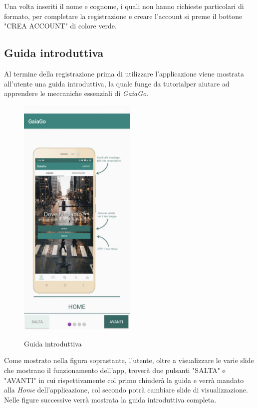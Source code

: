 Una volta inseriti il nome e cognome, i quali non hanno richieste particolari di formato, per completare la registrazione e creare l'account si preme il bottone "CREA ACCOUNT" di colore verde.
\pagebreak
\subsection{Guida introduttiva}
Al termine della registrazione prima di utilizzare l'applicazione viene mostrata all'utente una guida introduttiva, la quale funge da tutorial\glosp per aiutare ad apprendere le meccaniche essenziali di \textit{GaiaGo}.
\begin{figure}[H] 
	\centering 
	\includegraphics[width=0.5\textwidth]{res/images/intro1.jpg}\\
	\caption{Guida introduttiva}
	\label{guidaintroduttiva}
\end{figure}
\pagebreak
Come mostrato nella figura soprastante, l'utente, oltre a visualizzare le varie slide che mostrano il funzionamento dell'app, troverà due pulsanti "SALTA" e "AVANTI" in cui rispettivamente col primo chiuderà la guida e verrà mandato alla \textit{Home} dell'applicazione, col secondo potrà cambiare slide di visualizzazione. Nelle figure successive verrà mostrata la guida introduttiva completa.
